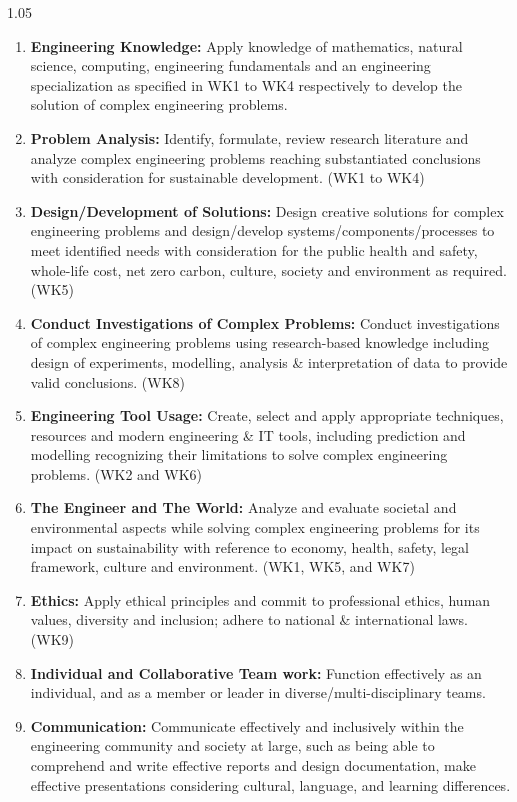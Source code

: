 \begin{spacing}{1.05}
\begin{enumerate}
    \item \textbf{Engineering Knowledge:} Apply knowledge of mathematics, natural science, computing, engineering fundamentals and an engineering specialization as specified in WK1 to WK4 respectively to develop the solution of complex engineering problems.
    \item \textbf{Problem Analysis:} Identify, formulate, review research literature and analyze complex engineering problems reaching substantiated conclusions with consideration for sustainable development. (WK1 to WK4)
    \item \textbf{Design/Development of Solutions:} Design creative solutions for complex engineering problems and design/develop systems/components/processes to meet identified needs with consideration for the public health and safety, whole-life cost, net zero carbon, culture, society and environment as required. (WK5)
    \item \textbf{Conduct Investigations of Complex Problems:} Conduct investigations of complex engineering problems using research-based knowledge including design of experiments, modelling, analysis \& interpretation of data to provide valid conclusions. (WK8)
    \item \textbf{Engineering Tool Usage:} Create, select and apply appropriate techniques, resources and modern engineering \& IT tools, including prediction and modelling recognizing their limitations to solve complex engineering problems. (WK2 and WK6)
    \item \textbf{The Engineer and The World:} Analyze and evaluate societal and environmental aspects while solving complex engineering problems for its impact on sustainability with reference to economy, health, safety, legal framework, culture and environment. (WK1, WK5, and WK7)
    \item \textbf{Ethics:} Apply ethical principles and commit to professional ethics, human values, diversity and inclusion; adhere to national \& international laws. (WK9)
    \item \textbf{Individual and Collaborative Team work:} Function effectively as an individual, and as a member or leader in diverse/multi-disciplinary teams.
    \item \textbf{Communication:} Communicate effectively and inclusively within the engineering community and society at large, such as being able to comprehend and write effective reports and design documentation, make effective presentations considering cultural, language, and learning differences.

\end{enumerate}
\end{spacing}
